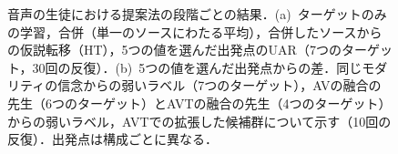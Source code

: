 \begin{figure}[t]
\centering
{}
\caption{音声の生徒における提案法の段階ごとの結果．(a)~ターゲットのみの学習，合併（単一のソースにわたる平均），合併したソースからの仮説転移（HT），5つの値を選んだ出発点のUAR（7つのターゲット，30回の反復）．(b)~5つの値を選んだ出発点からの差．同じモダリティの信念からの弱いラベル（7つのターゲット），AVの融合の先生（6つのターゲット）とAVTの融合の先生（4つのターゲット）からの弱いラベル，AVTでの拡張した候補群について示す（10回の反復）．出発点は構成ごとに異なる．}
\label{fig:ladder}
\end{figure}

